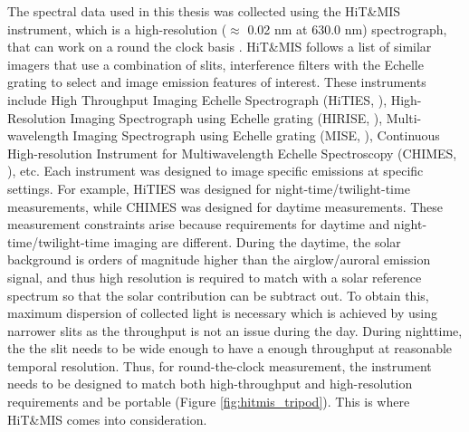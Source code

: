 \documentclass[crop=false,class=mitthesis,oneside,font=12pt]{standalone}
\begin{document}
The spectral data used in this thesis was collected using the HiT\&MIS instrument, which is a high-resolution ($\approx$ 0.02 nm at 630.0 nm) spectrograph, that can work on a round the clock basis \citep{hitmis}. HiT\&MIS follows a list of similar imagers that use a combination of slits, interference filters with the Echelle grating to select and image emission features of interest. These instruments include High Throughput Imaging Echelle Spectrograph (HiTIES, \cite{hities}), High-Resolution Imaging Spectrograph using Echelle grating (HIRISE, \cite{hirise}), Multi-wavelength Imaging Spectrograph using Echelle grating (MISE, \cite{mise}), Continuous High-resolution Instrument for Multiwavelength Echelle Spectroscopy (CHIMES, \cite{chimes}), etc. Each instrument was designed to image specific emissions at specific settings. For example, HiTIES was designed for night-time/twilight-time measurements, while CHIMES was designed for daytime measurements. These measurement constraints arise because requirements for daytime and night-time/twilight-time imaging are different. During the daytime, the solar background is orders of magnitude higher than the airglow/auroral emission signal, and thus high resolution is required to match with a solar reference spectrum so that the solar contribution can be subtract out. To obtain this, maximum dispersion of collected light is necessary which is achieved by using narrower slits as the throughput is not an issue during the day. During nighttime, the the slit needs to be wide enough to have a enough throughput at reasonable temporal resolution. Thus, for round-the-clock measurement, the instrument needs to be designed to match both high-throughput and high-resolution requirements and be portable (Figure \ref{fig:hitmis_tripod}). This is where HiT\&MIS comes into consideration.
\end{document}

